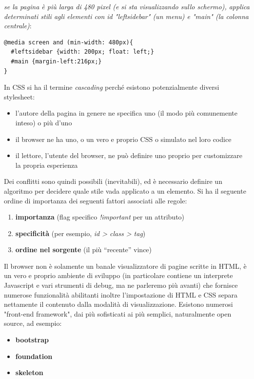 \documentclass[a4paper,12pt, oneside]{book}
\begin{document}
\textit{se la pagina è più larga di 480
pixel (e si sta visualizzando sullo schermo), applica
determinati stili agli elementi con id "leftsidebar" (un menu) e "main" (la colonna centrale)}:
\begin{verbatim}
@media screen and (min-width: 480px){
  #leftsidebar {width: 200px; float: left;}
  #main {margin-left:216px;}
}
\end{verbatim}
In CSS si ha il termine \textit{cascading} perché esistono potenzialmente diversi stylesheet:
\begin{itemize}
\item l'autore della pagina in genere ne specifica uno (il modo più comunemente inteso) o più d'uno
\item il browser ne ha uno, o un vero e proprio CSS o simulato nel loro codice
\item il lettore, l’utente del browser, ne può definire uno proprio per customizzare la propria esperienza
\end{itemize}
Dei conflitti sono quindi possibili (inevitabili), ed è necessario definire un algoritmo per decidere quale stile vada applicato a un elemento. Si ha il seguente ordine di importanza dei seguenti fattori associati alle regole:
\begin{enumerate}
\item \textbf{importanza} (flag specifico \textit{!important} per un attributo)
\item \textbf{specificità} (per esempio, \textit{id > class > tag})
\item \textbf{ordine nel sorgente }(il più “recente” vince)
\end{enumerate}
Il browser non è solamente un banale visualizzatore di pagine
scritte in HTML, è un vero e proprio ambiente di sviluppo (in
particolare contiene un interprete Javascript e vari strumenti di debug, ma ne parleremo più avanti) che fornisce numerose funzionalità abilitanti inoltre l'impostazione di HTML e CSS separa nettamente il contenuto
dalla modalità di visualizzazione. Esistono numerosi "front-end framework", dai più sofisticati ai
più semplici, naturalmente open
source, ad esempio:
\begin{itemize}
\item \textbf{bootstrap}
\item \textbf{foundation}
\item \textbf{skeleton}
\end{itemize}
\end{document}
